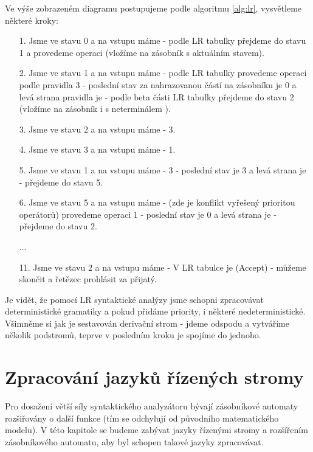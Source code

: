 \begin{exmp}
Ve výše zobrazeném diagramu postupujeme podle algoritmu \ref{alg:lr},
vysvětleme některé kroky:
  \begin{itemize}
    \item[1.] Jsme ve stavu 0 a na vstupu máme  - podle LR tabulky přejdeme do
    stavu 1 a provedeme operaci  (vložíme  na zásobník s aktuálním stavem).
    \item[2.] Jsme ve stavu 1 a na vstupu máme \symb{*} - podle LR tabulky provedeme
    operaci  podle pravidla 3 - poslední stav za nahrazovanou částí na
    zásobníku je 0 a levá strana pravidla je  - podle beta části LR tabulky
    přejdeme do stavu 2 (vložíme na zásobník i s neterminálem ).
    \item[3.] Jsme ve stavu 2 a na vstupu máme \symb{*} -  3.
    \item[4.] Jsme ve stavu 3 a na vstupu máme  -  1.
    \item[5.] Jsme ve stavu 1 a na vstupu máme \symb{+} -  3
     - poslední stav je 3 a levá strana je  - přejdeme do stavu 5.
    \item[6.] Jsme ve stavu 5 a na vstupu máme \symb{+} - (zde je konflikt vyřešený prioritou operátorů)
    provedeme operaci  1 - poslední stav je 0 a levá strana je  - přejdeme do stavu 2.
    \item[] ...
    \item[11.] Jsme ve stavu 2 a na vstupu máme \symb{\$} - V LR tabulce je 
    (Accept) - můžeme skončit a řetězec prohlásit za přijatý.
  \end{itemize}
\end{exmp}

Je vidět, že pomocí LR syntaktické analýzy jsme schopni zpracovávat deterministické
gramatiky a pokud přidáme priority, i některé nedeterministické. Všimněme si jak je
sestavován derivační strom - jdeme odspodu a vytváříme několik podstromů,
teprve v posledním kroku je spojíme do jednoho.


\chapter{Zpracování jazyků řízených stromy}
\label{chap:TreeLangs}

Pro dosažení větší síly syntaktického analyzátoru bývají zásobníkové automaty
rozšiřovány o další funkce (tím se odchylují od původního matematického modelu).
V této kapitole se budeme zabývat jazyky řízenými stromy a rozšířením
zásobníkového automatu, aby byl schopen takové jazyky zpracovávat.\\

